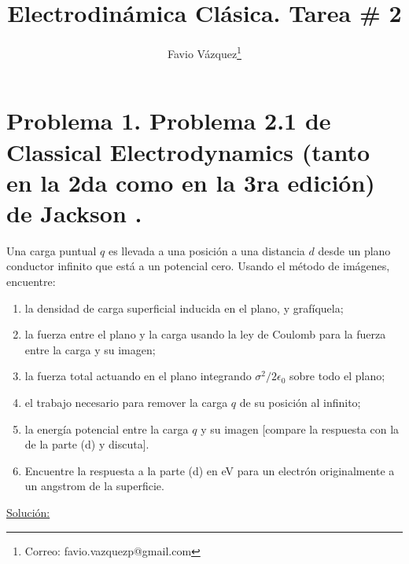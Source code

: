 \documentclass[a4paper,10pt]{article}
\title{Electrodinámica Clásica. Tarea \# 2}
\author{Favio Vázquez\thanks{Correo: favio.vazquezp@gmail.com}}\affil{Instituto de Ciencias Nucleares. Universidad Nacional Autónoma de México.}
\date{}
\numberwithin{equation}{section}
\begin{document}
\makeatletter
\def\@maketitle{%
  \newpage
  \null
  \vskip 2em%
  \begin{center}%
  \let \footnote \thanks
    {\Large\bfseries \@title \par}%
    \vskip 1.5em%
    {\normalsize
      \lineskip .5em%
      \begin{tabular}[t]{c}%
        \@author
      \end{tabular}\par}%
    \vskip 1em%
    {\normalsize \@date}%
  \end{center}%
  \par
  \vskip 1.5em}
\makeatother

\maketitle

\section{Problema 1. Problema 2.1 de Classical Electrodynamics (tanto en la 2da 
como en la 3ra edición) de Jackson \cite{jackson2,jackson3}.}

Una carga puntual $q$ es llevada a una posición a una distancia $d$ desde un 
plano conductor infinito que está a un potencial cero. Usando el método de imágenes, 
encuentre: 

\begin{enumerate}[label=\textbf{(\alph*)}]
 \item la densidad de carga superficial inducida en el plano, y grafíquela;
 \item la fuerza entre el plano y la carga usando la ley de Coulomb para la fuerza 
 entre la carga y su imagen;
 \item la fuerza total actuando en el plano integrando $\sigma^2/2\epsilon_0$ 
 sobre todo el plano;
 \item el trabajo necesario para remover la carga $q$ de su posición al infinito;
 \item la energía potencial entre la carga $q$ y su imagen [compare la respuesta 
 con la de la parte (d) y discuta].
 \item Encuentre la respuesta a la parte (d) en eV para un electrón originalmente 
 a un angstrom de la superficie.
\end{enumerate}

\vspace{.3cm}

\underline{Solución:} \vspace{.3cm}
\end{document}
